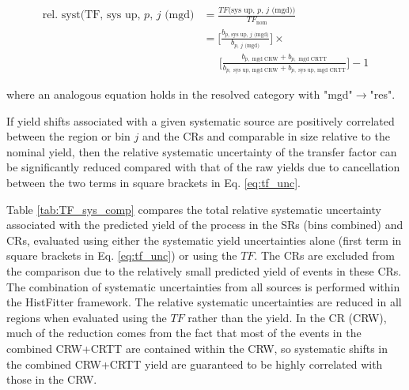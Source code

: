 \begin{equation}
\label{eq:tf_unc}
\begin{aligned}
\text{rel. syst}\text{(TF, sys up, \(p\), \(j\) (mgd)} &= \frac{TF(\text{sys up, \(p\), \(j\) (mgd))}}{TF_\text{nom}} \\ 
&= \Bigg[\frac{b_\text{\(p\), sys up, \(j\) (mgd)}}{b_\text{\(p\), \(j\) (mgd)}}\Bigg] \times \\
& \phantom{xxl} \Bigg[\frac{b_{p,\text{ mgd CRW}}  + b_{p,\text{ mgd CRTT}}}{b_{p,\text{ sys up, mgd CRW}}  + b_{p,\text{ sys up, mgd CRTT}}}\Bigg] -1
\end{aligned}
\end{equation}

\noindent where an analogous equation holds in the resolved category with "mgd"\(\rightarrow\)"res". 

If yield shifts associated with a given systematic source are positively correlated between the region or bin \(j\) and the CRs and comparable in size relative to the nominal yield, then the relative systematic uncertainty of the transfer factor can be significantly reduced compared with that of the raw yields due to cancellation between the two terms in square brackets in Eq. \ref{eq:tf_unc}. 

Table \ref{tab:TF_sys_comp} compares the total relative systematic uncertainty associated with the predicted yield of the \wjets process in the SRs (bins combined) and \wjets CRs, evaluated using either the systematic yield uncertainties alone (first term in square brackets in Eq. \ref{eq:tf_unc}) or using the \(TF\). The \ttbar CRs are excluded from the comparison due to the relatively small predicted yield of \wjets events in these CRs. The combination of systematic uncertainties from all sources is performed within the HistFitter framework. The relative systematic uncertainties are reduced in all regions when evaluated using the \(TF\) rather than the yield. In the \wjets CR (CRW), much of the reduction comes from the fact that most of the \wjets events in the combined CRW+CRTT are contained within the CRW, so systematic shifts in the combined CRW+CRTT yield are guaranteed to be highly correlated with those in the CRW. 

